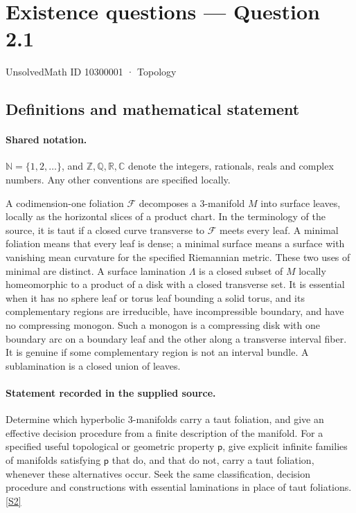 \documentclass[11pt]{article}
\newcommand{\sref}[2]{\hyperlink{source:#1:#2}{[S#2]}}
\begin{document}
\setcounter{section}{10300000}
\section{Existence questions — Question 2.1}\label{10300001}
{\small\sffamily UnsolvedMath ID 10300001 · Topology}
\subsection{Definitions and mathematical statement}

\paragraph{Shared notation.}$\mathbb N=\{1,2,\ldots\}$, and $\mathbb Z,\mathbb Q,\mathbb R,\mathbb C$ denote the integers, rationals, reals and complex numbers. Any other conventions are specified locally.


A codimension-one foliation $\mathcal F$ decomposes a $3$-manifold $M$ into surface leaves, locally as the horizontal slices of a product chart. In the terminology of the source, it is taut if a closed curve transverse to $\mathcal F$ meets every leaf. A minimal foliation means that every leaf is dense; a minimal surface means a surface with vanishing mean curvature for the specified Riemannian metric. These two uses of minimal are distinct. A surface lamination $\Lambda$ is a closed subset of $M$ locally homeomorphic to a product of a disk with a closed transverse set. It is essential when it has no sphere leaf or torus leaf bounding a solid torus, and its complementary regions are irreducible, have incompressible boundary, and have no compressing monogon. Such a monogon is a compressing disk with one boundary arc on a boundary leaf and the other along a transverse interval fiber. It is genuine if some complementary region is not an interval bundle. A sublamination is a closed union of leaves.
\paragraph{Statement recorded in the supplied source.}
Determine which hyperbolic $3$-manifolds carry a taut foliation, and give an effective decision procedure from a finite description of the manifold. For a specified useful topological or geometric property $\mathsf p$, give explicit infinite families of manifolds satisfying $\mathsf p$ that do, and that do not, carry a taut foliation, whenever these alternatives occur. Seek the same classification, decision procedure and constructions with essential laminations in place of taut foliations. \sref{10300001}{2}
\end{document}
